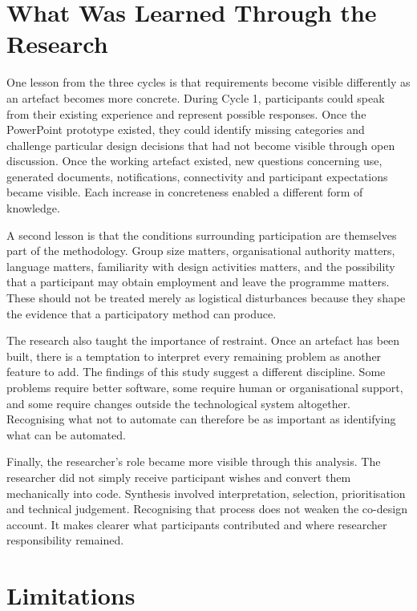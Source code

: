\section{What Was Learned Through the Research}

One lesson from the three cycles is that requirements become visible differently as an artefact becomes more concrete. During Cycle 1, participants could speak from their existing experience and represent possible responses. Once the PowerPoint prototype existed, they could identify missing categories and challenge particular design decisions that had not become visible through open discussion. Once the working artefact existed, new questions concerning use, generated documents, notifications, connectivity and participant expectations became visible. Each increase in concreteness enabled a different form of knowledge.

A second lesson is that the conditions surrounding participation are themselves part of the methodology. Group size matters, organisational authority matters, language matters, familiarity with design activities matters, and the possibility that a participant may obtain employment and leave the programme matters. These should not be treated merely as logistical disturbances because they shape the evidence that a participatory method can produce.

The research also taught the importance of restraint. Once an artefact has been built, there is a temptation to interpret every remaining problem as another feature to add. The findings of this study suggest a different discipline. Some problems require better software, some require human or organisational support, and some require changes outside the technological system altogether. Recognising what not to automate can therefore be as important as identifying what can be automated.

Finally, the researcher's role became more visible through this analysis. The researcher did not simply receive participant wishes and convert them mechanically into code. Synthesis involved interpretation, selection, prioritisation and technical judgement. Recognising that process does not weaken the co-design account. It makes clearer what participants contributed and where researcher responsibility remained.


\section{Limitations}

